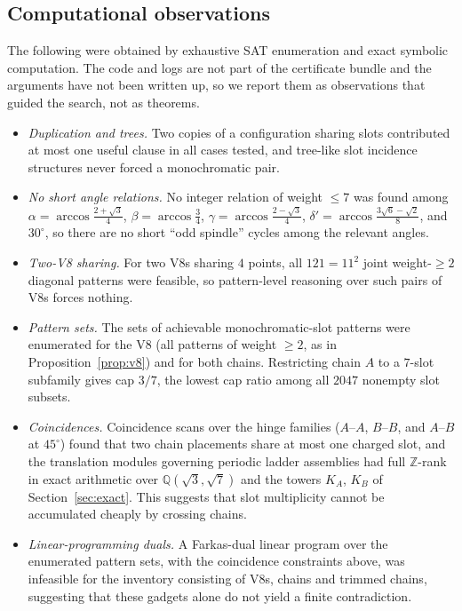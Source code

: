 \documentclass[11pt]{article}
\theoremstyle{definition}
\theoremstyle{remark}
\newcommand{\Z}{\mathbb{Z}}
\newcommand{\Q}{\mathbb{Q}}
\begin{document}
\subsection{Computational observations}\label{sec:verdict}

The following were obtained by exhaustive SAT enumeration and exact
symbolic computation.  The code and logs are not part of the certificate
bundle and the arguments have not been written up, so we report them as
observations that guided the search, not as theorems.

\begin{itemize}
\item \emph{Duplication and trees.}  Two copies of a configuration
sharing slots contributed at most one useful clause in all cases tested,
and tree-like slot incidence structures never forced a monochromatic
pair.
\item \emph{No short angle relations.}  No integer relation of weight
$\le7$ was found among $\alpha=\arccos\tfrac{2+\sqrt3}4$,
$\beta=\arccos\tfrac34$, $\gamma=\arccos\tfrac{2-\sqrt3}4$,
$\delta'=\arccos\tfrac{3\sqrt6-\sqrt2}8$, and $30^\circ$, so there are
no short ``odd spindle'' cycles among the relevant angles.
\item \emph{Two-V8 sharing.}  For two V8s sharing $4$ points, all
$121=11^2$ joint weight-$\ge2$ diagonal patterns were feasible, so
pattern-level reasoning over such pairs of V8s forces nothing.
\item \emph{Pattern sets.}  The sets of achievable monochromatic-slot
patterns were enumerated for the V8 (all patterns of weight $\ge2$, as in
Proposition~\ref{prop:v8}) and for both chains.  Restricting chain $A$ to
a $7$-slot subfamily gives cap $3/7$, the lowest cap ratio among all
$2047$ nonempty slot subsets.
\item \emph{Coincidences.}  Coincidence scans over the hinge families
($A$--$A$, $B$--$B$, and $A$--$B$ at $45^\circ$) found that two chain
placements share at most one charged slot, and the translation modules
governing periodic ladder assemblies had full $\Z$-rank in exact
arithmetic over $\Q(\sqrt3,\sqrt7)$ and the towers $K_A$, $K_B$ of
Section~\ref{sec:exact}.  This suggests that slot multiplicity cannot be
accumulated cheaply by crossing chains.
\item \emph{Linear-programming duals.}  A Farkas-dual linear program over
the enumerated pattern sets, with the coincidence constraints above, was
infeasible for the inventory consisting of V8s, chains and trimmed
chains, suggesting that these gadgets alone do not yield a finite
contradiction.
\end{itemize}
\end{document}
